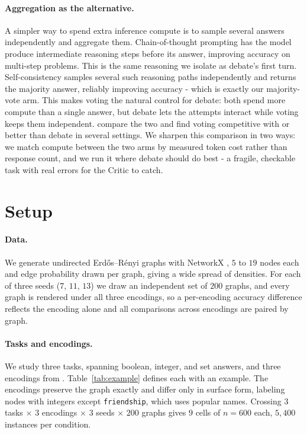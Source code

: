 \documentclass[11pt]{article}
\begin{document}
\paragraph{Aggregation as the alternative.}
A simpler way to spend extra inference compute is to sample several answers
independently and aggregate them. Chain-of-thought prompting \citep{wei2022cot}
has the model produce intermediate reasoning steps before its answer, improving
accuracy on multi-step problems. This is the same reasoning we isolate as debate's
first turn. Self-consistency \citep{wang2023selfconsistency} samples several such
reasoning paths independently and returns the majority answer, reliably improving
accuracy - which is exactly our majority-vote arm. This makes voting the natural
control for debate: both spend more compute than a single answer, but debate lets
the attempts interact while voting keeps them independent.
\citet{choi2025debateorvote} compare the two and find voting competitive with or
better than debate in several settings. We sharpen this comparison in two ways:
we match compute between the two arms by measured token cost rather than response
count, and we run it where debate should do best - a fragile, checkable task with
real errors for the Critic to catch.


\section{Setup}
\label{sec:setup}

\paragraph{Data.}
We generate undirected Erd\H{o}s--R\'enyi graphs with NetworkX
\citep{hagberg2008networkx}, $5$ to $19$ nodes each and edge probability drawn per
graph, giving a wide spread of densities. For each of three seeds
($7$, $11$, $13$) we draw an independent set of $200$ graphs, and every graph is
rendered under all three encodings, so a per-encoding accuracy difference reflects
the encoding alone and all comparisons across encodings are paired by graph.

\paragraph{Tasks and encodings.}
We study three tasks, spanning boolean, integer, and set answers, and three
encodings from \citet{fatemi2024talk}. Table~\ref{tab:example} defines each with an
example. The encodings preserve the graph exactly and differ only in surface form,
labeling nodes with integers except \texttt{friendship}, which uses popular names.
Crossing $3$ tasks $\times$ $3$ encodings $\times$ $3$ seeds $\times$ $200$ graphs
gives $9$ cells of $n=600$ each, $5{,}400$ instances per condition.
\end{document}
